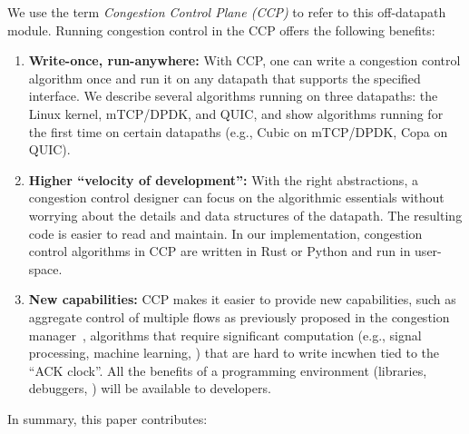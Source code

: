 We use the term {\em Congestion Control Plane (CCP)} to refer to this off-datapath module. Running congestion control in the CCP offers the following benefits:
\begin{enumerate}
    \item {\bf Write-once, run-anywhere:} With CCP, one can write a congestion control algorithm once and run it on any datapath that supports the specified interface. 
    We describe several algorithms running on three datapaths: the Linux kernel, mTCP/DPDK, and QUIC, and show algorithms running for the first time on certain datapaths (e.g., Cubic on mTCP/DPDK, Copa on QUIC).
    \item {\bf Higher ``velocity of development'':} With the right abstractions,
      a congestion control designer can focus on the algorithmic essentials
      without worrying about the details and data structures of the
      datapath. The resulting code is easier to read and maintain. In our implementation, congestion control algorithms in CCP are written in Rust or Python and run in user-space. 

    \item {\bf New capabilities:} CCP makes it easier to provide new
      capabilities, such as aggregate control of multiple flows as previously
      proposed in the congestion manager~\cite{cm}, algorithms that require significant computation (e.g., signal processing, machine learning, \etc) that are hard to write incwhen tied to the ``ACK clock''.
    All the benefits of a \userspace
      programming environment (libraries, debuggers, \etc) will be available to
      developers.
\end{enumerate}

\vspace{0.1in}
In summary, this paper contributes:

